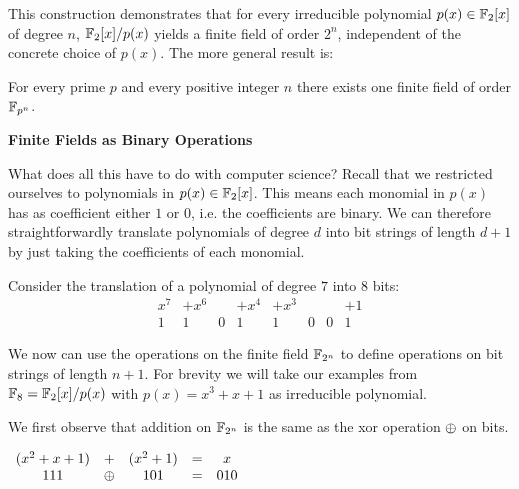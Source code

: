 This construction demonstrates that for every irreducible polynomial
$p(x)\in{ \mathbb{F}_2[x]}$ of degree $n$, ${ \mathbb{F}_2[x]/p(x)}$ yields a finite field of order $2^n$,
independent of the concrete choice of $p(x)$. The more general
result is:
\begin{theorem}{}
  For every prime $p$ and every positive integer $n$ there exists one finite
  field of order $\mathbb{F}_{p^n}$.
\end{theorem}

\newpage
\textbf{\large Finite Fields as Binary Operations}

What does all this have to do with computer science? Recall that we restricted
ourselves to polynomials in $p(x)\in{ \mathbb{F}_2[x]}$. This means each monomial in $p(x)$
has as coefficient either $1$ or $0$, i.e. the coefficients are binary. We can
therefore straightforwardly translate polynomials of degree $d$ into bit strings
of length $d+1$ by just taking the coefficients of each monomial.

\example Consider the translation of a polynomial of degree $7$ into $8$ bits:
\[\begin{array}{cccccccr}
 x^7 & + x^6 & & + x^4 & + x^3 & & & +1\\
1 & 1 & 0 & 1 & 1& 0 & 0& 1
\end{array}\]

We now can use the operations on the finite field $\mathbb{F}_{2^n}$ to define
operations on bit strings of length $n+1$. For brevity we will take our examples
from $\mathbb{F}_8={ \mathbb{F}_2[x]/p(x)}$ with $p(x)=x^3+x+1$ as irreducible polynomial.

We first observe that addition on $\mathbb{F}_{2^n}$ is the same as the xor operation
${\oplus}$ on bits.

\example $\begin{array}{cccccccr}
(x^2+x+1) &+ & (x^2+1) & = & x\\
111 & {\oplus} & 101 & = & 010
\end{array}$

